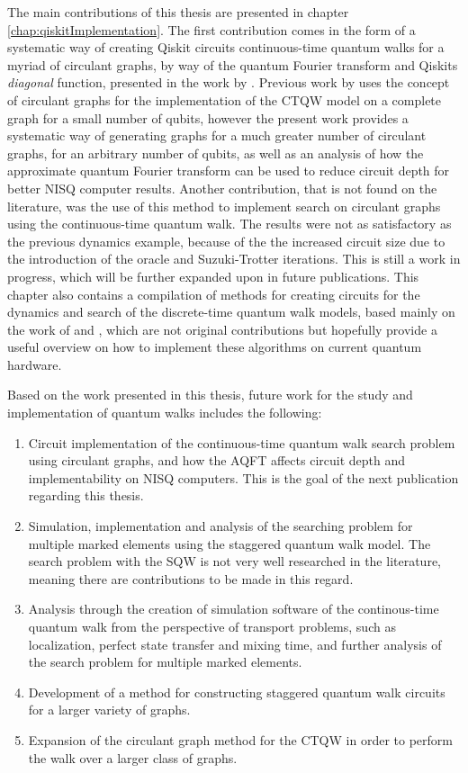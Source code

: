 \documentclass[../../dissertation.tex]{subfiles}
\begin{document}
The main contributions of this thesis are presented in chapter
\ref{chap:qiskitImplementation}. The first contribution comes in the form
of a systematic way of creating Qiskit circuits continuous-time quantum walks
for a myriad of circulant graphs, by way of the quantum Fourier transform and
Qiskits \textit{diagonal} function, presented in the work by \cite{chagassantos21}. Previous work by \cite{qiang2016} uses
the concept of circulant graphs for the implementation of the CTQW model on a
complete graph for a small number of qubits, however the present work provides
a systematic way of generating graphs for a much greater number of circulant
graphs, for an arbitrary number of qubits, as well as an analysis of how the
approximate quantum Fourier transform can be used to reduce circuit depth for
better NISQ computer results. 
Another contribution, that is not found on the
literature, was the use of this method to implement search on circulant graphs
using the continuous-time quantum walk.  The results were not as satisfactory
as the previous dynamics example, because of the the increased circuit size due
to the introduction of the oracle and Suzuki-Trotter iterations. This is still
a work in progress, which will be further expanded upon in future publications.
This chapter also contains a compilation of methods for creating circuits for
the dynamics and search of the discrete-time quantum walk models, based mainly
on the work of \cite{douglaswang07} and \cite{acasiete2020}, which are not
original contributions but hopefully provide a useful overview on how to
implement these algorithms on current quantum hardware.\par

Based on the work presented in this thesis, future work for the study and
implementation of quantum walks includes the following:
\begin{enumerate}
	\item Circuit implementation of the continuous-time quantum walk search problem using circulant graphs, and how the AQFT affects circuit depth and implementability on NISQ computers. This is the goal of the next publication regarding this thesis.
	\item Simulation, implementation and analysis of the searching problem for multiple marked elements using the staggered quantum walk model. The search problem with the SQW is not very well researched in the literature, meaning there are contributions to be made in this regard.
	\item Analysis through the creation of simulation software of the continous-time quantum walk from the perspective of transport problems, such as localization, perfect state transfer and mixing time, and further analysis of the search problem for multiple marked elements.
	\item Development of a method for constructing staggered quantum walk circuits for a larger variety of graphs.
	\item Expansion of the circulant graph method for the CTQW in order to perform the walk over a larger class of graphs.
\end{enumerate}
\end{document}
